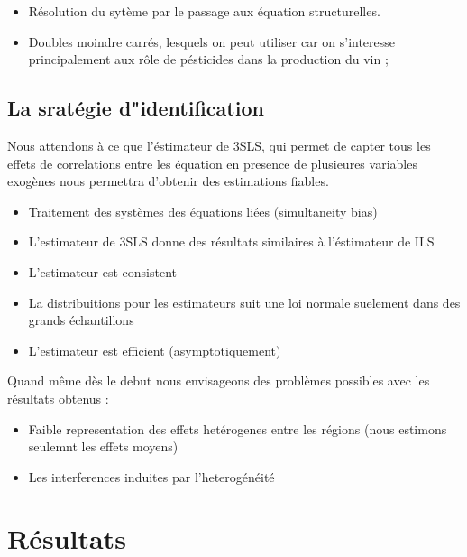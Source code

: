 \documentclass[11pt,]{article}
\providecommand{\tightlist}{%
  \setlength{\itemsep}{0pt}\setlength{\parskip}{0pt}}
\begin{document}
\begin{itemize}
  \item Résolution du sytème par le passage aux équation structurelles.
  \item Doubles moindre carrés, lesquels on peut utiliser car on s'interesse principalement aux rôle de pésticides dans la production du vin ;
\end{itemize}

\FloatBarrier

\FloatBarrier

\FloatBarrier

\hypertarget{la-srategie-didentification}{%
\subsection{La sratégie
d"identification}\label{la-srategie-didentification}}

Nous attendons à ce que l'éstimateur de 3SLS, qui permet de capter tous
les effets de correlations entre les équation en presence de plusieures
variables exogènes nous permettra d'obtenir des estimations fiables.

\begin{itemize}
\tightlist
\item
  Traitement des systèmes des équations liées (simultaneity bias)
\item
  L'estimateur de 3SLS donne des résultats similaires à l'éstimateur de
  ILS
\item
  L'estimateur est consistent
\item
  La distribuitions pour les estimateurs suit une loi normale suelement
  dans des grands échantillons
\item
  L'estimateur est efficient (asymptotiquement)
\end{itemize}

Quand même dès le debut nous envisageons des problèmes possibles avec
les résultats obtenus :

\begin{itemize}
\tightlist
\item
  Faible representation des effets hetérogenes entre les régions (nous
  estimons seulemnt les effets moyens)
\item
  Les interferences induites par l'heterogénéité
\end{itemize}

\hypertarget{resultats}{%
\section{Résultats}\label{resultats}}
\end{document}
